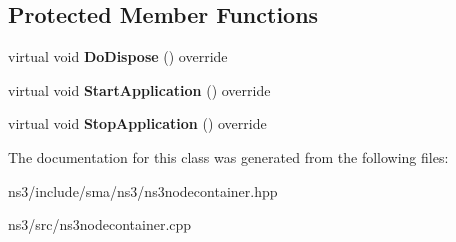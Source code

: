 \subsection*{Protected Member Functions}
\begin{DoxyCompactItemize}
\item 
\hypertarget{classsma_1_1Ns3NodeContainer_a493122868e16dac6a995199ee283e51c}{virtual void {\bfseries Do\-Dispose} () override}\label{classsma_1_1Ns3NodeContainer_a493122868e16dac6a995199ee283e51c}

\item 
\hypertarget{classsma_1_1Ns3NodeContainer_a0a9999e48d25caee6421a95896be6486}{virtual void {\bfseries Start\-Application} () override}\label{classsma_1_1Ns3NodeContainer_a0a9999e48d25caee6421a95896be6486}

\item 
\hypertarget{classsma_1_1Ns3NodeContainer_a6ebdc650d95f836932f76db067e5dbf2}{virtual void {\bfseries Stop\-Application} () override}\label{classsma_1_1Ns3NodeContainer_a6ebdc650d95f836932f76db067e5dbf2}

\end{DoxyCompactItemize}


The documentation for this class was generated from the following files\-:\begin{DoxyCompactItemize}
\item 
ns3/include/sma/ns3/ns3nodecontainer.\-hpp\item 
ns3/src/ns3nodecontainer.\-cpp\end{DoxyCompactItemize}
